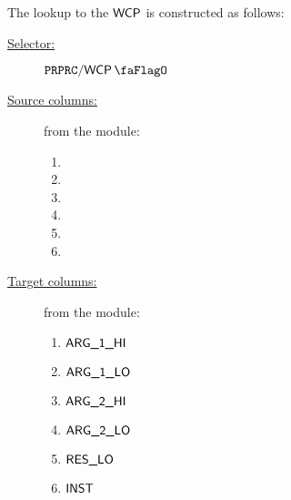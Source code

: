 The lookup to the $\textsf{WCP}$ is constructed as follows:
\begin{description}
	\item[\underline{Selector:}] $\ppWcpFlag$
	\item[\underline{Source columns:}] from the \expMod{} module:
	      \begin{multicols}{3}
		      \begin{enumerate}
			      \item \ppWcpArgOneHi{}
			      \item \ppWcpArgOneLo{}
			      \item \ppWcpArgTwoHi{}
			      \item \ppWcpArgTwoLo{}
			      \item \ppWcpRes{}
			      \item \ppWcpInst{}
		      \end{enumerate}
	      \end{multicols}
	\item[\underline{Target columns:}] from the \wcpMod{} module:
	      \begin{multicols}{3}
		      \begin{enumerate}
			      \item $\textsf{ARG}\textsf{\_1}\textsf{\_HI}$
			      \item $\textsf{ARG}\textsf{\_1}\textsf{\_LO}$
			      \item $\textsf{ARG}\textsf{\_2}\textsf{\_HI}$
			      \item $\textsf{ARG}\textsf{\_2}\textsf{\_LO}$
			      \item $\textsf{RES}\textsf{\_LO}$
			      \item $\textsf{INST}$
		      \end{enumerate}
	      \end{multicols}
\end{description}
